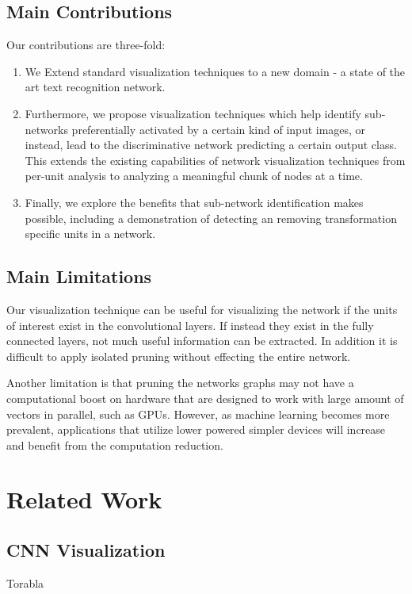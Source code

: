 \documentclass[10pt,twocolumn,letterpaper]{article}
\begin{document}
\subsection{Main Contributions}
Our contributions are three-fold:
\begin{enumerate}
\item We Extend standard visualization techniques to a new domain - a state of the art text recognition network.

\item Furthermore, we propose visualization techniques which help identify sub-networks preferentially activated by a certain kind of input images, or instead, lead to the discriminative network predicting a certain output class. This extends the existing capabilities of network visualization techniques from per-unit analysis to analyzing a meaningful chunk of nodes at a time. 
\item \color{red} Finally, we explore the benefits that sub-network identification makes possible, including a demonstration of detecting an removing transformation specific units in a network.
\end{enumerate}

\subsection{Main Limitations}
Our visualization technique can be useful for visualizing the network if the units of interest exist in the convolutional layers. If instead they exist in the fully connected layers, not much useful information can be extracted. In addition it is difficult to apply isolated pruning without effecting the entire network.

Another limitation is that pruning the networks graphs may not have a computational boost on hardware that are designed to work with large amount of vectors in parallel, such as GPUs. However, as machine learning becomes more prevalent, applications that utilize lower powered simpler devices will increase and benefit from the computation reduction.

\section{Related Work}
\subsection{CNN Visualization}


Torabla
\end{document}
